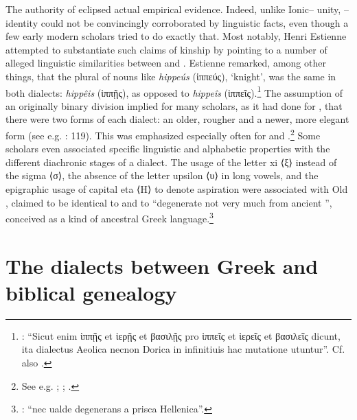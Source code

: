 The authority of  eclipsed actual empirical evidence. Indeed, unlike Ion\-ic– unity, – identity could not be convincingly corroborated by linguistic facts, even though a few early modern scholars tried to do exactly that. Most notably, Henri Estienne attempted to substantiate such claims of kinship by pointing to a number of alleged linguistic similarities between  and . Estienne remarked, among other things, that the  plural of nouns like \textit{hippeús} (ἱππεύς), ‘knight’, was the same in both dialects: \textit{hippêis} (ἱππῇς), as opposed to  \textit{hippeîs} (ἱππεῖς).\footnote{\citet[25--26]{Estienne1581}: “Sicut enim ἱππῇς et ἱερῇς et βασιλῇς pro ἱππεῖς et ἱερεῖς et βασιλεῖς dicunt, ita dialectus Aeolica necnon Dorica in infinitiuis hac mutatione utuntur”. Cf. also \citet[179]{Trendelenburg1782}.} The assumption of an originally binary division implied for many scholars, as it had done for , that there were two forms of each dialect: an older, rougher and a newer, more elegant form (see e.g. \citealt{Mazzocchi1754}: 119). This was emphasized especially often for  and .\footnote{See e.g. \citet[18]{Hauptmann1737}; \citet[137]{Walch1772}; \citet[\textsc{iv–v}]{Facius1782}.} Some scholars even associated specific linguistic and alphabetic properties with the different diachronic stages of a dialect. The usage of the letter xi ⟨ξ⟩ instead of the sigma ⟨σ⟩, the absence of the letter upsilon ⟨υ⟩ in long vowels, and the epigraphic usage of capital eta ⟨H⟩ to denote aspiration were associated with Old , claimed to be identical to  and to “degenerate not very much from ancient ”, conceived as a kind of ancestral Greek language.\footnote{\citet[4--5]{Munthe1748}: “nec ualde degenerans a prisca Hellenica”.}

\section{The dialects between Greek and biblical genealogy}\label{sec:5.3}

